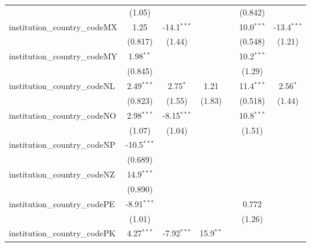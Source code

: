 \begin{tabular}{lcccccc}
                                         & (1.05)         &               &               &            & (0.842)       &   \\   
   institution\_country\_codeMX          & 1.25           & -14.1$^{***}$ &               &            & 10.0$^{***}$  & -13.4$^{***}$\\   
                                         & (0.817)        & (1.44)        &               &            & (0.548)       & (1.21)\\   
   institution\_country\_codeMY          & 1.98$^{**}$    &               &               &            & 10.2$^{***}$  &   \\   
                                         & (0.845)        &               &               &            & (1.29)        &   \\   
   institution\_country\_codeNL          & 2.49$^{***}$   & 2.75$^{*}$    & 1.21          &            & 11.4$^{***}$  & 2.56$^{*}$\\   
                                         & (0.823)        & (1.55)        & (1.83)        &            & (0.518)       & (1.44)\\   
   institution\_country\_codeNO          & 2.98$^{***}$   & -8.15$^{***}$ &               &            & 10.8$^{***}$  &   \\   
                                         & (1.07)         & (1.04)        &               &            & (1.51)        &   \\   
   institution\_country\_codeNP          & -10.5$^{***}$  &               &               &            &               &   \\   
                                         & (0.689)        &               &               &            &               &   \\   
   institution\_country\_codeNZ          & 14.9$^{***}$   &               &               &            &               &   \\   
                                         & (0.890)        &               &               &            &               &   \\   
   institution\_country\_codePE          & -8.91$^{***}$  &               &               &            & 0.772         &   \\   
                                         & (1.01)         &               &               &            & (1.26)        &   \\   
   institution\_country\_codePK          & 4.27$^{***}$   & -7.92$^{***}$ & 15.9$^{**}$   &            &               &   \\   

\end{tabular}
